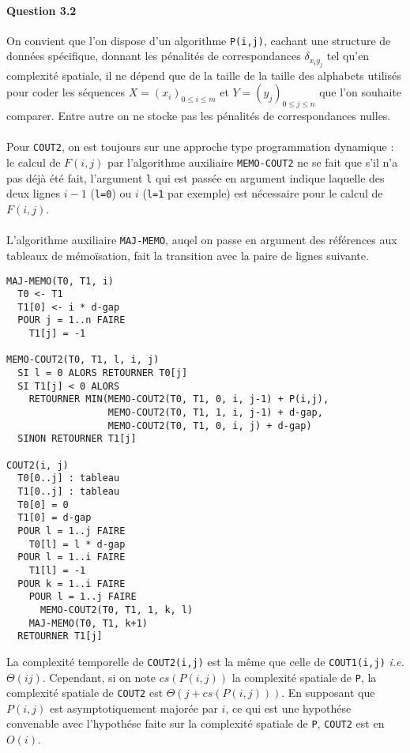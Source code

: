 \paragraph{Question 3.2}
On convient que l'on dispose d'un algorithme \verb'P(i,j)', cachant
une structure de donn\'ees sp\'ecifique, donnant les p\'enalit\'es de
correspondances $\delta_{x_iy_j}$ tel qu'en complexit\'e spatiale, il
ne d\'epend que de la taille de la taille des alphabets utilis\'es
pour coder les s\'equences $X=(x_i)_{0\leq i\leq m}$ et
$Y=(y_j)_{0\leq j\leq n}$ que l'on souhaite comparer. Entre autre on
ne stocke pas les p\'enalit\'es de correspondances nulles.\\\\
Pour \verb'COUT2', on est toujours sur une approche type programmation
dynamique : le calcul de $F(i,j)$ par l'algorithme auxiliaire
\verb'MEMO-COUT2' ne se fait que s'il n'a pas d\'ej\`a \'et\'e fait,
l'argument \verb'l' qui est pass\'ee en argument indique laquelle des
deux lignes $i-1$ (\verb'l=0') ou $i$ (\verb'l=1' par exemple) est
n\'ecessaire pour le calcul de $F(i,j)$.\\\\
L'algorithme auxiliaire \verb'MAJ-MEMO', auqel on passe en argument
des r\'ef\'erences aux tableaux de m\'emo\"isation, fait la transition
avec la paire de lignes suivante.
\begin{verbatim}
MAJ-MEMO(T0, T1, i)
  T0 <- T1
  T1[0] <- i * d-gap
  POUR j = 1..n FAIRE
    T1[j] = -1

MEMO-COUT2(T0, T1, l, i, j)
  SI l = 0 ALORS RETOURNER T0[j]
  SI T1[j] < 0 ALORS
    RETOURNER MIN(MEMO-COUT2(T0, T1, 0, i, j-1) + P(i,j),
                  MEMO-COUT2(T0, T1, 1, i, j-1) + d-gap,
                  MEMO-COUT2(T0, T1, 0, i, j) + d-gap)
  SINON RETOURNER T1[j]

COUT2(i, j)
  T0[0..j] : tableau
  T1[0..j] : tableau
  T0[0] = 0
  T1[0] = d-gap
  POUR l = 1..j FAIRE
    T0[l] = l * d-gap
  POUR l = 1..i FAIRE
    T1[l] = -1
  POUR k = 1..i FAIRE
    POUR l = 1..j FAIRE
      MEMO-COUT2(T0, T1, 1, k, l)
    MAJ-MEMO(T0, T1, k+1)
  RETOURNER T1[j]
\end{verbatim}
La complexit\'e temporelle de \verb'COUT2(i,j)' est la m\^eme que
celle de \verb'COUT1(i,j)' \emph{i.e.} $\Theta(ij)$. Cependant, si on
note $cs(P(i,j))$ la complexit\'e spatiale de \verb'P', la
complexit\'e spatiale de \verb'COUT2' est $\Theta(j+cs(P(i,j)))$. En
supposant que $P(i,j)$ est asymptotiquement major\'ee par $i$, ce qui
est une hypoth\'ese convenable avec l'hypoth\'ese faite sur la
complexit\'e spatiale de \verb'P', \verb'COUT2' est en $O(i)$.

